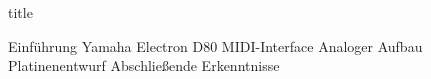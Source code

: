 \documentclass{article}
\begin{document}
{title}

\frontmatter

\tableofcontents

\listoffigures
\listoftables

\mainmatter

{Einführung}
{Yamaha Electron D80}
{MIDI-Interface}
{Analoger Aufbau}
{Platinenentwurf}
{Abschließende Erkenntnisse}


\newpage
\printbibliography[heading = bibintoc, title = Quellen]    %

\end{document}
